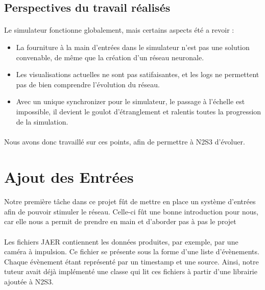 \documentclass[a4paper,10pt]{article}
\begin{document}
\subsection{Perspectives du travail réalisés}
\paragraph{}
Le simulateur fonctionne globalement, mais certains aspects été a revoir :
\begin{itemize}
\item{La fourniture à la main d’entrées dans le simulateur n’est pas une solution convenable, de même que la création d’un réseau neuronale.}
\item{Les visualisations actuelles ne sont pas satifaisantes, et les logs ne permettent pas de bien comprendre l’évolution du réseau.}
\item{Avec un unique synchronizer pour le simulateur, le passage à l’échelle est impossible, il devient le goulot d’étranglement et ralentis toutes la progression de la simulation.}
\end{itemize}

\paragraph{}
Nous avons donc travaillé sur ces points, afin de permettre à N2S3 d’évoluer.

\newpage

\section{Ajout des Entrées}

\paragraph{}
Notre première tâche dans ce projet fût de mettre en place un système d'entrées afin de pouvoir stimuler le réseau. Celle-ci fût une bonne introduction pour nous, car elle nous a permit de prendre en main et d’aborder pas à pas le projet

\paragraph{}
Les fichiers JAER contiennent les données produites, par exemple, par une caméra à impulsion. Ce fichier se présente sous la forme d’une liste d'évènements. Chaque évènement étant représenté par un timestamp et une source. Ainsi, notre tuteur avait déjà implémenté une classe qui lit ces fichiers à partir d’une librairie ajoutée à N2S3. 
\end{document}

